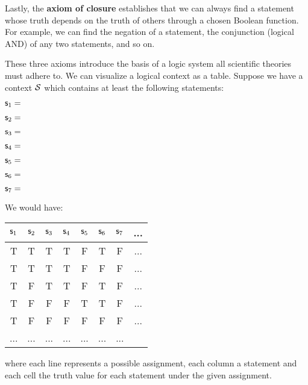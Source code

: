 \documentclass[letterpaper]{article}
\begin{document}
Lastly, the \textbf{axiom of closure} establishes that we can always find a statement whose truth depends on the truth of others through a chosen Boolean function. For example, we can find the negation of a statement, the conjunction (logical AND) of any two statements, and so on.

These three axioms introduce the basis of a logic system all scientific theories must adhere to. We can visualize a logical context as a table. Suppose we have a context $\mathcal{S}$ which contains at least the following statements:
\begin{description}
	\item $\mathsf{s}_1=$
	\item $\mathsf{s}_2=$
	\item $\mathsf{s}_3=$
	\item $\mathsf{s}_4=$
	\item $\mathsf{s}_5=$
	\item $\mathsf{s}_6=$
	\item $\mathsf{s}_7=$
\end{description}
We would have:
\begin{center}
	\begin{tabular}{c|c|c|c|c|c|c|c}
		$\mathsf{s}_1$ & $\mathsf{s}_2$ & $\mathsf{s}_3$ & $\mathsf{s}_4$ & $\mathsf{s}_5$ & $\mathsf{s}_6$ & $\mathsf{s}_7$ & ... \\
		\hline
		T & T & T & T & F & T & F & ... \\
		T & T & T & T & F & F & F & ... \\
		T & F & T & T & F & T & F & ... \\
		T & F & F & F & T & T & F & ... \\
		T & F & F & F & F & F & F & ... \\
		... & ... & ... & ... & ... & ... & ... \\
	\end{tabular}
\end{center}
where each line represents a possible assignment, each column a statement and each cell the truth value for each statement under the given assignment.
\end{document}
